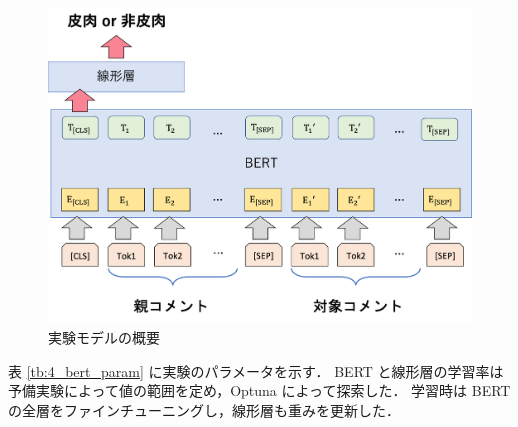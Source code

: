  \begin{figure}[tb]
 	\begin{center}
	 \includegraphics[width=0.8\linewidth]{./figure/40_model.png}
	 \end{center}
 \caption{実験モデルの概要}
 \label{fig:40_model}
 \end{figure}


表 \ref{tb:4_bert_param} に実験のパラメータを示す．
BERT と線形層の学習率は予備実験によって値の範囲を定め，Optuna \cite{akiba2019optuna} によって探索した．
学習時は BERT の全層をファインチューニングし，線形層も重みを更新した．
\par

